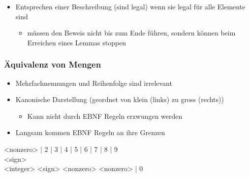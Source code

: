 \documentclass[11pt]{article}
\begin{document}
\begin{itemize}
\item Entsprechen einer Beschreibung (sind legal) wenn sie legal für alle Elemente sind\\
\begin{itemize}
\item müssen den Beweis nicht bis zum Ende führen, sondern können beim Erreichen eines Lemmas stoppen\\
\end{itemize}
\end{itemize}

\subsubsection{Äquivalenz von Mengen}
\label{sec:org240436e}
\begin{itemize}
\item Mehrfachnennungen und Reihenfolge sind irrelevant\\
\item Kanonische Darstellung (geordnet von klein (links) zu gross (rechts))\\
\begin{itemize}
\item Kann nicht durch EBNF Regeln erzwungen werden\\
\end{itemize}
\item Langsam kommen EBNF Regeln an ihre Grenzen\\
\end{itemize}

<nonzero>  | 2 | 3 | 4 | 5 | 6 | 7 | 8 | 9\\
<sign> \Leftarrow [+|-]\\
<integer> \Leftarrow <sign> <nonzero> {<nonzero> | 0}\\
\end{document}

